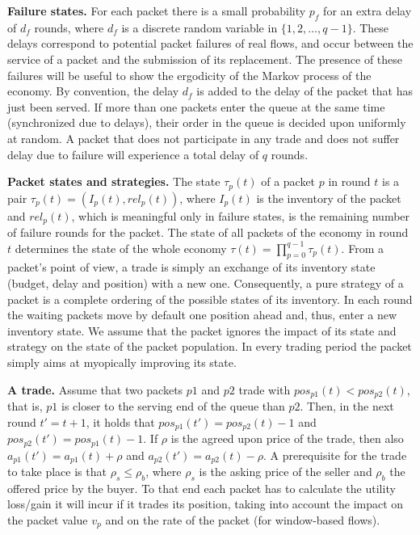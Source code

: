 \documentclass[letterpaper,10pt]{llncs}
\begin{document}
\textbf{Failure states.}
For each packet there is a small probability $p_f$ for an extra delay of $d_f$ rounds, where $d_f$ is a discrete random variable in $\{1,2,\dots,q-1\}$.
These delays correspond to potential packet failures of real flows, and occur
between the service of a packet and the submission of its replacement.
The presence 
of these failures will be useful to show the ergodicity of the Markov process of the economy.
By convention, the delay $d_f$ is added to the delay of the packet that has just been served. If more than one packets enter the queue at the same time (synchronized due to delays), 
their order in the queue is decided upon uniformly at random. 
A packet that does not participate in any trade and does not suffer delay due to failure will
experience a total delay of $q$ rounds.

{\bf Packet states and strategies.}
The state $\tau_p(t)$ of a packet $p$ in round $t$ is a pair
$\tau_p(t)=(I_p(t), rel_p(t))$, where $I_p(t)$ is the inventory of the packet and $rel_p(t)$, which is meaningful only in failure states, is the remaining number of failure rounds for the packet.
The state of all packets of the economy in round $t$ determines the state of the whole economy $\tau(t) = \prod_{p=0}^{q-1} \tau_p(t)$.
From a packet's point of view, a trade is simply an exchange of its inventory state (budget, delay and position)
with a new one. Consequently, a pure strategy of a packet is a complete ordering of the possible states
of its inventory. 
In each round the waiting packets move by default one position ahead and, thus, enter 
a new inventory state. 
We assume that the packet ignores the impact of its state and strategy on the state of the packet population.
In every trading period the packet simply aims at myopically improving its state.


{\bf A trade.}
Assume that two packets $p1$ and $p2$ trade with $pos_{p1}(t) < pos_{p2}(t)$, that is, $p1$ is closer to the serving end of the queue than $p2$. Then, in the next round $t' = t+1$, it holds that $pos_{p1}(t') = pos_{p2}(t) - 1$ and $pos_{p2}(t') = pos_{p1}(t) - 1$. If $\rho$ is the agreed upon price of the trade, then also $a_{p1}(t') = a_{p1}(t) + \rho$ and $a_{p2}(t') = a_{p2}(t) - \rho$. A prerequisite for the trade to take place is that $\rho_s \leq \rho_b$, where
$\rho_s$ is the asking price of the seller and $\rho_b$ the offered price by the buyer.
To that end each packet has to calculate the utility loss/gain it will incur if it trades its position,
taking into account the impact on the packet value $v_p$ and on the rate of the packet (for window-based flows).
\end{document}
